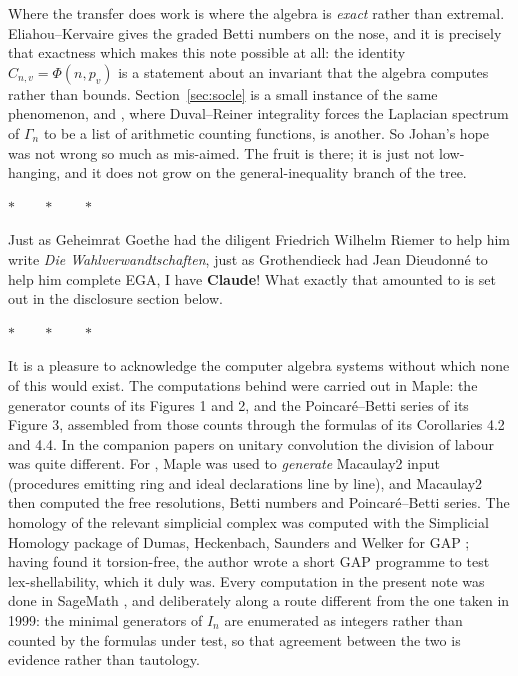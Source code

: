 \documentclass[a4paper,11pt,oneside,reqno]{amsart}
\theoremstyle{definition}
\theoremstyle{remark}
\theoremstyle{plain}
\newcommand{\Gam}{\Gamma}
\begin{document}
Where the transfer does work is where the algebra is \emph{exact} rather than
extremal. Eliahou--Kervaire gives the graded Betti numbers on the nose, and it
is precisely that exactness which makes this note possible at all: the identity
\(C_{n,v} = \Phi(n,p_v)\) is a statement about an invariant that the algebra
computes rather than bounds. Section~\ref{sec:socle} is a small instance of the
same phenomenon, and \cite{SnellmanLaplacians}, where Duval--Reiner
integrality forces the Laplacian spectrum of \(\Gam_n\) to be a list of
arithmetic counting functions, is another. So Johan's hope was not wrong so
much as mis-aimed. The fruit is there; it is just not low-hanging, and it does
not grow on the general-inequality branch of the tree.

\begin{center}\small\(\ast\qquad\ast\qquad\ast\)\end{center}

Just as Geheimrat Goethe had the diligent Friedrich Wilhelm Riemer to help him
write \emph{Die Wahlverwandtschaften}, just as Grothendieck had Jean Dieudonné
to help him complete EGA, I have \textbf{Claude}! What exactly that amounted to
is set out in the disclosure section below.

\begin{center}\small\(\ast\qquad\ast\qquad\ast\)\end{center}

It is a pleasure to acknowledge the computer algebra systems without which
none of this would exist. The computations behind \cite{Snellman2000} were
carried out in \textsf{Maple}: the generator counts of its Figures 1 and 2,
and the Poincaré--Betti series of its Figure 3, assembled from those counts
through the formulas of its Corollaries 4.2 and 4.4. In the companion papers
on unitary convolution the division of labour was quite different. For
\cite{SnellmanUnitaryGeneral,SnellmanUnitaryN}, \textsf{Maple} was used to \emph{generate}
\textsf{Macaulay2} \cite{Macaulay2} input (procedures emitting ring and
ideal declarations line by line), and \textsf{Macaulay2} then computed the
free resolutions, Betti numbers and Poincaré--Betti series. The homology of the
relevant simplicial complex was computed with the \textsf{Simplicial Homology}
package \cite{SimplicialHomology} of Dumas, Heckenbach, Saunders and Welker for
\textsf{GAP} \cite{GAP}; having found it torsion-free, the author wrote a short
\textsf{GAP} programme to test lex-shellability, which it duly was. Every
computation in the present note was done in \textsf{SageMath} \cite{Sage}, and
deliberately along a route different from the one taken
in 1999: the minimal generators of \(I_n\) are enumerated as integers rather
than counted by the formulas under test, so that agreement between the two is
evidence rather than tautology.
\end{document}
